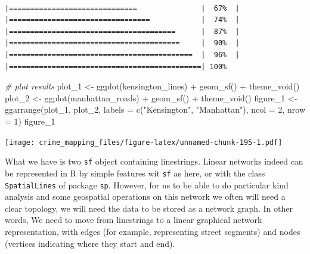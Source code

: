 \documentclass[
  krantz2]{krantz}
\makeatletter
\newenvironment{Shaded}{\begin{snugshade}}{\end{snugshade}}
\newcommand{\AttributeTok}[1]{\textcolor[rgb]{0.61,0.61,0.61}{#1}}
\newcommand{\CommentTok}[1]{\textcolor[rgb]{0.37,0.37,0.37}{\textit{#1}}}
\newcommand{\DecValTok}[1]{\textcolor[rgb]{0.06,0.06,0.06}{#1}}
\newcommand{\FunctionTok}[1]{\textcolor[rgb]{0,0,0}{#1}}
\newcommand{\NormalTok}[1]{#1}
\newcommand{\OtherTok}[1]{\textcolor[rgb]{0.37,0.37,0.37}{#1}}
\newcommand{\SpecialCharTok}[1]{\textcolor[rgb]{0,0,0}{#1}}
\newcommand{\StringTok}[1]{\textcolor[rgb]{0.5,0.5,0.5}{#1}}
\newenvironment{kframe}{%
\medskip{}
\setlength{\fboxsep}{.8em}
 \def\at@end@of@kframe{}%
 \ifinner\ifhmode%
  \def\at@end@of@kframe{\end{minipage}}%
  \begin{minipage}{\columnwidth}%
 \fi\fi%
 \def\FrameCommand##1{\hskip\@totalleftmargin \hskip-\fboxsep
 \colorbox{shadecolor}{##1}\hskip-\fboxsep
     \hskip-\linewidth \hskip-\@totalleftmargin \hskip\columnwidth}%
 \MakeFramed {\advance\hsize-\width
   \@totalleftmargin\z@ \linewidth\hsize
   \@setminipage}}%
 {\par\unskip\endMakeFramed%
 \at@end@of@kframe}
\renewenvironment{Shaded}{\begin{kframe}}{\end{kframe}}
\makeatother
\begin{document}
\begin{verbatim}
                                            |==============================               |  67%  |                                                     |=================================            |  74%  |                                                     |=======================================      |  87%  |                                                     |========================================     |  90%  |                                                     |===========================================  |  96%  |                                                     |=============================================| 100%
\end{verbatim}

\begin{Shaded}
\begin{Highlighting}[]
\CommentTok{\# plot results }
\NormalTok{plot\_1 }\OtherTok{\textless{}{-}} \FunctionTok{ggplot}\NormalTok{(kensington\_lines) }\SpecialCharTok{+} \FunctionTok{geom\_sf}\NormalTok{() }\SpecialCharTok{+} \FunctionTok{theme\_void}\NormalTok{()}
\NormalTok{plot\_2 }\OtherTok{\textless{}{-}} \FunctionTok{ggplot}\NormalTok{(manhattan\_roads) }\SpecialCharTok{+} \FunctionTok{geom\_sf}\NormalTok{() }\SpecialCharTok{+} \FunctionTok{theme\_void}\NormalTok{()}
\NormalTok{figure\_1 }\OtherTok{\textless{}{-}} \FunctionTok{ggarrange}\NormalTok{(plot\_1, plot\_2, }\AttributeTok{labels =} \FunctionTok{c}\NormalTok{(}\StringTok{"Kensington"}\NormalTok{, }\StringTok{"Manhattan"}\NormalTok{),}
                    \AttributeTok{ncol =} \DecValTok{2}\NormalTok{, }\AttributeTok{nrow =} \DecValTok{1}\NormalTok{)}
\NormalTok{figure\_1}
\end{Highlighting}
\end{Shaded}

\texttt{[image: crime\_mapping\_files/figure-latex/unnamed-chunk-195-1.pdf]}

What we have is two \texttt{sf} object containing linestrings. Linear networks indeed can be represented in R by simple features wit \texttt{sf} as here, or with the class \texttt{SpatialLines} of package \texttt{sp}. However, for us to be able to do particular kind analysis and some geospatial operations on this network we often will need a clear topology, we will need the data to be stored as a network graph. In other words, We need to move from linestrings to a linear graphical network representation, with edges (for example, representing street segments) and nodes (vertices indicating where they start and end).
\end{document}
